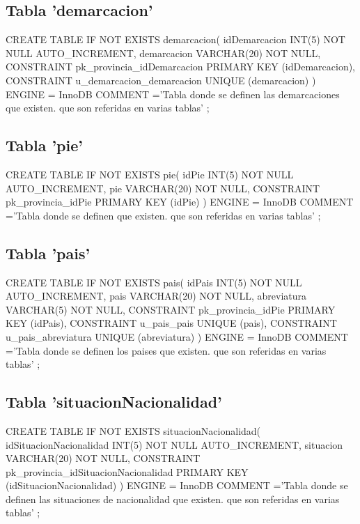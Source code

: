 \documentclass{article}
\begin{document}
  \subsection{Tabla 'demarcacion'}
    \begin{listing}[style=C]
      CREATE TABLE IF NOT EXISTS demarcacion(
        idDemarcacion INT(5) NOT NULL AUTO_INCREMENT,
        demarcacion VARCHAR(20) NOT NULL,
        CONSTRAINT pk_provincia_idDemarcacion PRIMARY KEY (idDemarcacion),
        CONSTRAINT u_demarcacion_demarcacion UNIQUE (demarcacion)
      )
      ENGINE = InnoDB
      COMMENT ='Tabla donde se definen las demarcaciones que existen. que son referidas en varias tablas'
      ;
    \end{listing}
  \subsection{Tabla 'pie'}
    \begin{listing}[style=C]
      CREATE TABLE IF NOT EXISTS pie(
        idPie INT(5) NOT NULL AUTO_INCREMENT,
        pie VARCHAR(20) NOT NULL,
        CONSTRAINT pk_provincia_idPie PRIMARY KEY (idPie)
      )
      ENGINE = InnoDB
      COMMENT ='Tabla donde se definen  que existen. que son referidas en varias tablas'
      ;
    \end{listing}

  \newpage
  \subsection{Tabla 'pais'}
    \begin{listing}[style=C]
      CREATE TABLE IF NOT EXISTS pais(
        idPais INT(5) NOT NULL AUTO_INCREMENT,
        pais VARCHAR(20) NOT NULL,
        abreviatura VARCHAR(5) NOT NULL,
        CONSTRAINT pk_provincia_idPie PRIMARY KEY (idPais),
        CONSTRAINT u_pais_pais UNIQUE (pais),
        CONSTRAINT u_pais_abreviatura UNIQUE (abreviatura)
      )
      ENGINE = InnoDB
      COMMENT ='Tabla donde se definen los paises que existen. que son referidas en varias tablas'
      ;
    \end{listing}
  \subsection{Tabla 'situacionNacionalidad'}
    \begin{listing}[style=C]
      CREATE TABLE IF NOT EXISTS situacionNacionalidad(
        idSituacionNacionalidad INT(5) NOT NULL AUTO_INCREMENT,
        situacion VARCHAR(20) NOT NULL,
        CONSTRAINT pk_provincia_idSituacionNacionalidad PRIMARY KEY (idSituacionNacionalidad)
      )
      ENGINE = InnoDB
      COMMENT ='Tabla donde se definen las situaciones de nacionalidad que existen. que son referidas en varias tablas'
      ;
    \end{listing}
  
\end{document}
